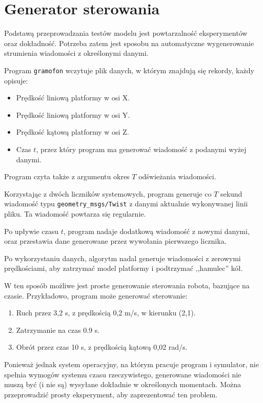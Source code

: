 \section{Generator sterowania}
	\label{sec:gramofon}
	Podstawą przeprowadzania testów modelu jest powtarzalność eksperymentów oraz dokładność.
	Potrzeba zatem jest sposobu na automatyczne wygenerowanie strumienia wiadomości z określonymi danymi.
	
	Program \texttt{gramofon} wczytuje plik danych, w którym znajdują się rekordy, każdy opisuje:
	\begin{itemize}
		\item Prędkość liniową platformy w osi X.
		\item Prędkość liniową platformy w osi Y.
		\item Prędkość kątową platformy w osi Z.
		\item Czas $t$, przez który program ma generować wiadomość z podanymi wyżej danymi.
	\end{itemize}
	Program czyta także z argumentu okres $T$ odświeżania wiadomości.
	
	Korzystając z dwóch liczników systemowych, program generuje co $T$ sekund wiadomość typu \texttt{geometry\_msgs/Twist} z danymi aktualnie wykonywanej linii pliku.
	Ta wiadomość powtarza się regularnie.
	
	Po upływie czasu $t$, program nadaje dodatkową wiadomość z nowymi danymi, oraz przestawia dane generowane przez wywołania pierwszego licznika.
	
	Po wykorzystaniu danych, algorytm nadal generuje wiadomości z zerowymi prędkościami, aby zatrzymać model platformy i podtrzymać ,,hamulec'' kół.
	
	W ten sposób możliwe jest proste generowanie sterowania robota, bazujące na czasie.
	Przykładowo, program może generować sterowanie:
	\begin{enumerate}
		\item Ruch przez 3,2 s, z prędkością 0,2 m/s, w kierunku (2,1).
		\item Zatrzymanie na czas 0.9 s.
		\item Obrót przez czas 10 s, z prędkością kątową 0,02 rad/s.
	\end{enumerate}
	
	Ponieważ jednak system operacyjny, na którym pracuje program i symulator, nie spełnia wymogów systemu czasu rzeczywistego, generowane wiadomości
	nie muszą być (i nie są) wysyłane dokładnie w określonych momentach. Można przeprowadzić prosty eksperyment, aby zaprezentować ten problem.
	
